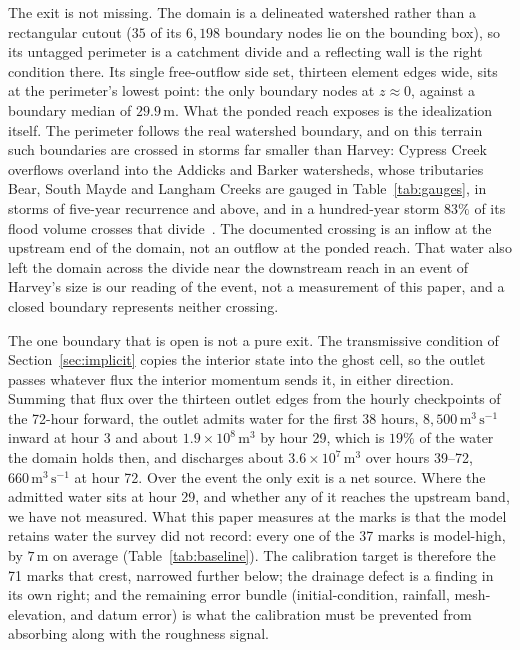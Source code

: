 \documentclass[11pt]{article}
\begin{document}
The exit is not missing. The domain is a delineated watershed rather
than a rectangular cutout ($35$ of its $6{,}198$ boundary nodes lie on
the bounding box), so its untagged perimeter is a catchment divide and
a reflecting wall is the right condition there. Its single
free-outflow side set, thirteen element edges wide, sits at the
perimeter's lowest point: the only boundary nodes at $z \approx 0$,
against a boundary median of $29.9$\,m. What the ponded reach exposes
is the idealization itself. The perimeter follows the real watershed
boundary, and on this terrain such boundaries are crossed in storms far
smaller than Harvey: Cypress Creek overflows overland into the Addicks
and Barker watersheds, whose tributaries Bear, South Mayde and Langham
Creeks are gauged in Table~\ref{tab:gauges}, in storms of five-year
recurrence and above, and in a hundred-year storm $83\%$ of its flood
volume crosses that divide~\cite{twdb2015cypress}. The documented
crossing is an inflow at the upstream end of the domain, not an outflow
at the ponded reach. That water also left the domain across the divide
near the downstream reach in an event of Harvey's size is our reading
of the event, not a measurement of this paper, and a closed boundary
represents neither crossing.

The one boundary that is open is not a pure exit. The transmissive
condition of Section~\ref{sec:implicit} copies the interior state into
the ghost cell, so the outlet passes whatever flux the interior
momentum sends it, in either direction. Summing that flux over the
thirteen outlet edges from the hourly checkpoints of the 72-hour
forward, the outlet admits water for the first 38 hours,
$8{,}500\,\mathrm{m^3\,s^{-1}}$ inward at hour 3 and about
$1.9\times10^{8}\,\mathrm{m^3}$ by hour 29, which is $19\%$ of the
water the domain holds then, and discharges about
$3.6\times10^{7}\,\mathrm{m^3}$ over hours 39--72,
$660\,\mathrm{m^3\,s^{-1}}$ at hour 72. Over the event the only exit
is a net source. Where the admitted water sits at hour 29, and whether
any of it reaches the upstream band, we have not measured.
What this paper measures at the marks is that the model retains water
the survey did not record: every one of the 37 marks is model-high, by $7$\,m on
average (Table~\ref{tab:baseline}). The calibration target is
therefore the 71 marks that crest, narrowed further below; the
drainage defect is a finding in its own right; and the remaining
error bundle (initial-condition, rainfall, mesh-elevation, and datum
error) is what the calibration must be prevented from absorbing along
with the roughness signal.
\end{document}
